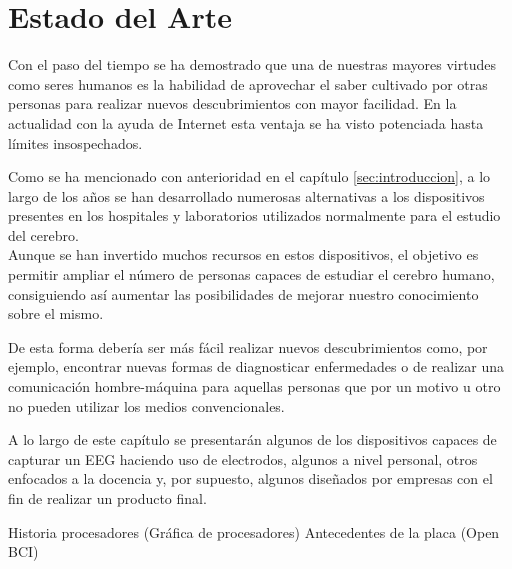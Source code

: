 \chapter{Estado del Arte\label{sec:EstadoDelArte}}

Con el paso del tiempo se ha demostrado que una de nuestras mayores virtudes como seres humanos es la habilidad de aprovechar el saber cultivado por otras personas para realizar nuevos descubrimientos con mayor facilidad. En la actualidad con la ayuda de Internet esta ventaja se ha visto potenciada hasta límites insospechados.

Como se ha mencionado con anterioridad en el capítulo \ref{sec:introduccion}, a lo largo de los años se han desarrollado numerosas alternativas a los dispositivos presentes en los hospitales y laboratorios utilizados normalmente para el estudio del cerebro. 
\\Aunque se han invertido muchos recursos en estos dispositivos, el objetivo es permitir ampliar el número de personas capaces de estudiar el cerebro humano, consiguiendo  así aumentar las posibilidades de mejorar nuestro conocimiento sobre el mismo.

De esta forma debería ser más fácil realizar nuevos descubrimientos como, por ejemplo, encontrar nuevas formas de diagnosticar enfermedades o de realizar una comunicación hombre-máquina para aquellas personas que por un motivo u otro no pueden utilizar los medios convencionales.

A lo largo de este capítulo se presentarán algunos de los dispositivos capaces de capturar un EEG haciendo uso de electrodos, algunos a nivel personal, otros enfocados a la docencia y, por supuesto, algunos diseñados por empresas con el fin de realizar un producto final.


Historia procesadores (Gráfica de procesadores)
Antecedentes de la placa (Open BCI)